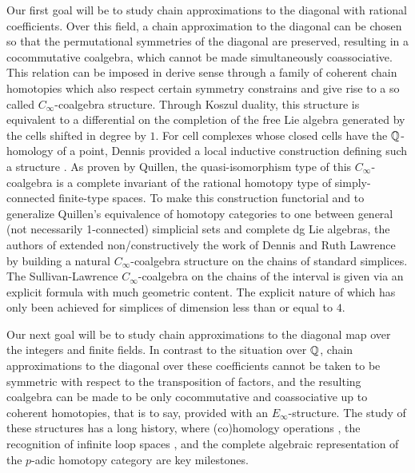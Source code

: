 Our first goal will be to study chain approximations to the diagonal with rational coefficients.
Over this field, a chain approximation to the diagonal can be chosen so that the permutational symmetries of the diagonal are preserved, resulting in a cocommutative coalgebra, which cannot be made simultaneously coassociative.
This relation can be imposed in derive sense through a family of coherent chain homotopies which also respect certain symmetry constrains and give rise to a so called $C_\infty$-coalgebra structure.
Through Koszul duality, this structure is equivalent to a differential on the completion of the free Lie algebra generated by the cells shifted in degree by $1$.
For cell complexes whose closed cells have the $\mathbb{Q}$-homology of a point, Dennis provided a local inductive construction defining such a structure \cite{sullivan2007appendix}.
As proven by Quillen, the quasi-isomorphism type of this $C_\infty$-coalgebra is a complete invariant of the rational homotopy type of simply-connected finite-type spaces.
To make this construction functorial and to generalize Quillen's equivalence of homotopy categories to one between general (not necessarily 1-connected) simplicial sets and complete dg Lie algebras, the authors of \cite{buijs2020liemodels} extended non\-/constructively the work of Dennis and Ruth Lawrence \cite{lawrence2014interval} by building a natural $C_\infty$-coalgebra structure on the chains of standard simplices.
The Sullivan-Lawrence $C_\infty$-coalgebra on the chains of the interval is given via an explicit formula with much geometric content.
The explicit nature of which has only been achieved for simplices of dimension less than or equal to $4$.

Our next goal will be to study chain approximations to the diagonal map over the integers and finite fields.
In contrast to the situation over $\mathbb{Q}$, chain approximations to the diagonal over these coefficients cannot be taken to be symmetric with respect to the transposition of factors, and the resulting coalgebra can be made to be only cocommutative and coassociative up to coherent homotopies, that is to say, provided with an $E_\infty$-structure.
The study of these structures has a long history, where (co)homology operations \cite{steenrod1962cohomology, may1970general}, the recognition of infinite loop spaces \cite{boardman1973homotopy, may1972geometry}, and the complete algebraic representation of the $p$-adic homotopy category \cite{mandell2001padic} are key milestones.

